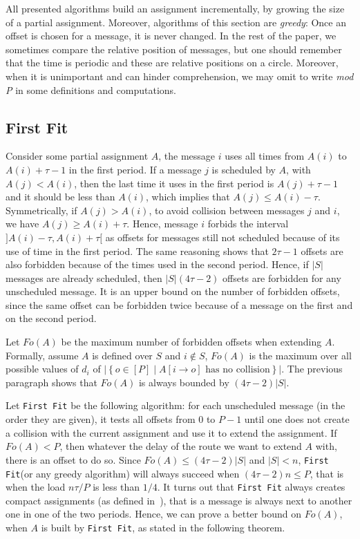 \documentclass[a4paper,cleveref, autoref, thm-restate,UKenglish]{lipics-v2019}
\newcommand\firstfit{\texttt{First Fit}\xspace}
\begin{document}
All presented algorithms build an assignment incrementally, by growing the size of a partial assignment. Moreover, algorithms of this section are \emph{greedy}: Once an offset is chosen for a message, it is never changed.
In the rest of the paper, we sometimes compare the relative position of messages, but one should remember that the
time is periodic and these are relative positions on a circle. Moreover, when it is unimportant and can hinder comprehension, we may omit to write \emph{mod P} in some definitions and computations.


\subsection{First Fit}


Consider some partial assignment $A$, the message $i$ uses all times from $A(i)$ to $A(i) + \tau -1$ in the first period. If a message $j$ is scheduled by $A$, with $A(j) < A(i)$, then the last time it uses in the first period is $A(j)+\tau-1$ and it should be less than $A(i)$, which implies that $A(j) \leq A(i) - \tau$. Symmetrically, if $A(j) > A(i)$, to avoid collision between messages $j$ and $i$, we have $A(j) \geq A(i) + \tau$. Hence, message $i$ forbids the interval $]A(i) - \tau, A(i) + \tau[$ as offsets for messages still not scheduled because of its use of time in the first period. The same reasoning shows that $2\tau -1$ offsets are also forbidden because of the times used in the second period. Hence, if $|S|$ messages are already scheduled, then $|S|(4\tau -2)$ offsets are forbidden for any unscheduled message. It is an upper bound on the number of forbidden offsets, since the same offset can be forbidden twice because of a message on the first and on the second period.

Let $Fo(A)$ be the maximum number of forbidden offsets when extending $A$. Formally, assume $A$ is defined over $S$ and $i\notin S$, $Fo(A)$ is the maximum over all possible values of $d_i$ of $|\left\{ o \in [P] \mid A[i \rightarrow o] \text{ has no collision}\right\}|$. The previous paragraph shows that $Fo(A)$ is always bounded by $(4 \tau -2)|S|$. 

Let \firstfit be the following algorithm:  for each unscheduled message (in the order they are given), it tests all offsets from $0$ to $P-1$ until one does not create a collision with the current assignment and use it to extend the assignment. If $Fo(A) < P$, then whatever the delay of the route we want to extend $A$ with, there is an offset to do so. Since $Fo(A) \leq (4 \tau -2)|S|$ and $|S| < n$, \firstfit (or any greedy algorithm) will always succeed when $(4 \tau -2)n \leq P$, that is when the load $ n\tau /P$ is less than $1/4$.
It turns out that \firstfit always creates compact assignments (as defined in~\cite{dominique2018deterministic}), that is a message is always next to another one in one of the two periods. Hence, we can prove a better bound on $Fo(A)$, when $A$ is built by \firstfit, as stated in the following theorem.
\end{document}

